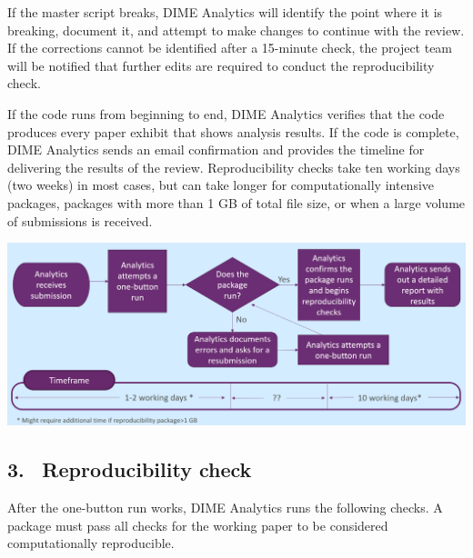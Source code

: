 \begin{fullwidth}
	\bigskip

 If the master script breaks, DIME Analytics will identify the point where it is breaking, document it, and attempt to make changes to continue with the review. If the corrections cannot be identified after a 15-minute check, the project team will be notified that further edits are required to conduct the reproducibility check.

	\bigskip

	If the code runs from beginning to end, DIME Analytics verifies that the code produces every paper exhibit that shows analysis results. If the code is complete, DIME Analytics sends an email confirmation and provides the timeline for delivering the results of the review. Reproducibility checks take ten working days (two weeks) in most cases, but can take longer for computationally intensive packages, packages with more than 1 GB of total file size, or when a large volume of submissions is received.

	\bigskip
	
	\begin{center}
		\includegraphics[width=0.9\linewidth]{../img/rep-checks-timeline.png}
	\end{center}

	\subsection{3. \, Reproducibility check}

	After the one-button run works, DIME Analytics runs the following checks. A package must pass all checks for the working paper to be considered computationally reproducible. 

	\bigskip


\end{fullwidth}
